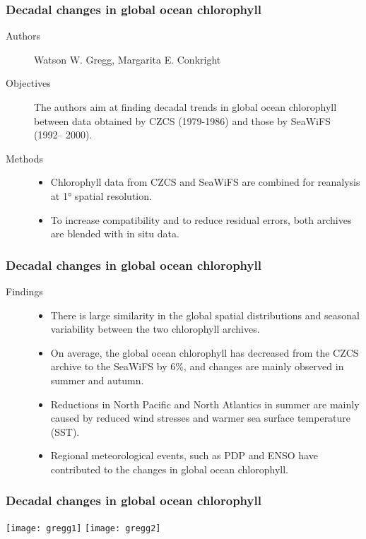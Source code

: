 \begin{frame}\frametitle{Decadal changes in global ocean chlorophyll} 
\begin{description}
    \item[Authors] Watson W. Gregg, Margarita E. Conkright
    \item[Objectives] The authors aim at finding decadal trends in global ocean chlorophyll between data obtained by CZCS (1979-1986) and those by SeaWiFS (1992– 2000).
    \item[Methods]
        \begin{itemize}
            \item Chlorophyll data from CZCS and SeaWiFS are combined for reanalysis at 1° spatial resolution. 
            \item To increase compatibility and to reduce residual errors, both archives are blended with in situ data. 
        \end{itemize}
\end{description}

\end{frame}

\begin{frame}\frametitle{Decadal changes in global ocean chlorophyll} 
\begin{description}
    \item[Findings] 
        \begin{itemize}
            \item There is large similarity in the global spatial distributions and seasonal variability between the two chlorophyll archives.  
            \item On average, the global ocean chlorophyll has decreased from the CZCS archive to the SeaWiFS by 6\%, and changes are mainly observed in summer and autumn.  
            \item Reductions in North Pacific and North Atlantics in summer are mainly caused by reduced wind stresses and warmer sea surface temperature (SST).  
            \item Regional meteorological events, such as PDP and ENSO have contributed to the changes in global ocean chlorophyll. 
        \end{itemize}
\end{description}
\end{frame}

\begin{frame}\frametitle{Decadal changes in global ocean chlorophyll} 
    \hfill
    \texttt{[image: gregg1]}
    \hfill
    \texttt{[image: gregg2]}
    \hfill
\end{frame}
